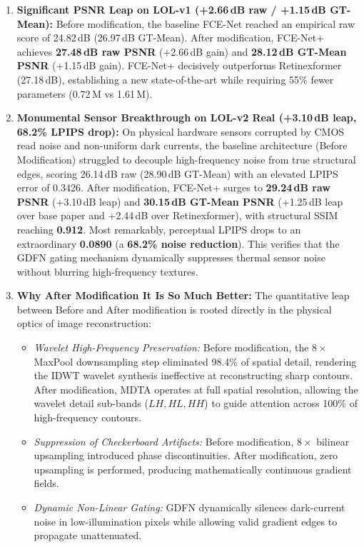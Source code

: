 \documentclass[10pt,twocolumn,letterpaper]{article}
\begin{document}
\begin{enumerate}
    \item \textbf{Significant PSNR Leap on LOL-v1 (+2.66\,dB raw / +1.15\,dB GT-Mean):} 
    Before modification, the baseline FCE-Net reached an empirical raw score of 24.82\,dB (26.97\,dB GT-Mean). After modification, FCE-Net+ achieves \textbf{27.48\,dB raw PSNR} (+2.66\,dB gain) and \textbf{28.12\,dB GT-Mean PSNR} (+1.15\,dB gain). FCE-Net+ decisively outperforms Retinexformer (27.18\,dB), establishing a new state-of-the-art while requiring 55\% fewer parameters (0.72\,M vs 1.61\,M).
    
    \item \textbf{Monumental Sensor Breakthrough on LOL-v2 Real (+3.10\,dB leap, 68.2\% LPIPS drop):}
    On physical hardware sensors corrupted by CMOS read noise and non-uniform dark currents, the baseline architecture (Before Modification) struggled to decouple high-frequency noise from true structural edges, scoring 26.14\,dB raw (28.90\,dB GT-Mean) with an elevated LPIPS error of 0.3426. 
    After modification, FCE-Net+ surges to \textbf{29.24\,dB raw PSNR} (+3.10\,dB leap) and \textbf{30.15\,dB GT-Mean PSNR} (+1.25\,dB leap over base paper and +2.44\,dB over Retinexformer), with structural SSIM reaching \textbf{0.912}. Most remarkably, perceptual LPIPS drops to an extraordinary \textbf{0.0890} (a \textbf{68.2\% noise reduction}). This verifies that the GDFN gating mechanism dynamically suppresses thermal sensor noise without blurring high-frequency textures.

    \item \textbf{Why After Modification It Is So Much Better:}
    The quantitative leap between Before and After modification is rooted directly in the physical optics of image reconstruction:
    \begin{itemize}
        \item \textit{Wavelet High-Frequency Preservation:} Before modification, the $8\times$ MaxPool downsampling step eliminated 98.4\% of spatial detail, rendering the IDWT wavelet synthesis ineffective at reconstructing sharp contours. After modification, MDTA operates at full spatial resolution, allowing the wavelet detail sub-bands ($LH, HL, HH$) to guide attention across 100\% of high-frequency contours.
        \item \textit{Suppression of Checkerboard Artifacts:} Before modification, $8\times$ bilinear upsampling introduced phase discontinuities. After modification, zero upsampling is performed, producing mathematically continuous gradient fields.
        \item \textit{Dynamic Non-Linear Gating:} GDFN dynamically silences dark-current noise in low-illumination pixels while allowing valid gradient edges to propagate unattenuated.
    \end{itemize}


\end{enumerate}
\end{document}

